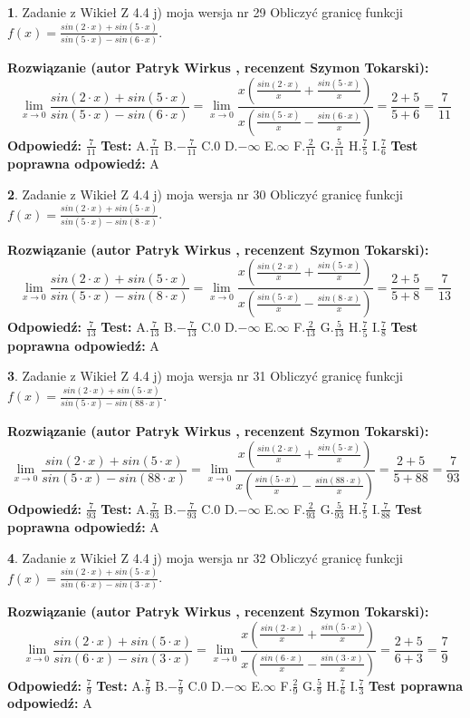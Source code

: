 \documentclass[12pt, a4paper]{article}
\theoremstyle{definition} %
\newtheorem{zad}{}
\newcommand{\zadStart}[1]{\begin{zad}#1\newline}
\newcommand{\zadStop}{\end{zad}}
\newcommand{\rozwStart}[2]{\noindent \textbf{Rozwiązanie (autor #1 , recenzent #2): }\newline}
\newcommand{\rozwStop}{\newline}
\newcommand{\odpStart}{\noindent \textbf{Odpowiedź:}\newline}
\newcommand{\odpStop}{\newline}
\newcommand{\testStart}{\noindent \textbf{Test:}\newline}
\newcommand{\testStop}{\newline}
\newcommand{\kluczStart}{\noindent \textbf{Test poprawna odpowiedź:}\newline}
\newcommand{\kluczStop}{\newline}
\begin{document}
\zadStart{Zadanie z Wikieł Z 4.4 j) moja wersja nr 29}
Obliczyć granicę funkcji $f(x)=\frac{sin(2\cdot x) +sin(5\cdot x)}{sin(5\cdot x) -sin(6\cdot x)}$.
\zadStop
\rozwStart{Patryk Wirkus}{Szymon Tokarski}
$$\lim\limits_{x\to 0}\frac{sin(2\cdot x) +sin(5\cdot x)}{sin(5\cdot x) -sin(6\cdot x)}=\lim\limits_{x\to 0}\frac{x(\frac{sin(2\cdot x)}{x}+\frac{sin(5\cdot x)}{x})}{x(\frac{sin(5\cdot x)}{x}-\frac{sin(6\cdot x)}{x})}=\frac{2+5}{5+6} = \frac{7}{11}$$
\rozwStop
\odpStart
$\frac{7}{11}$
\odpStop
\testStart
A.$\frac{7}{11}$
B.$-\frac{7}{11}$
C.$0$
D.$-\infty$
E.$\infty$
F.$\frac{2}{11}$
G.$\frac{5}{11}$
H.$\frac{7}{5}$
I.$\frac{7}{6}$
\testStop
\kluczStart
A
\kluczStop



\zadStart{Zadanie z Wikieł Z 4.4 j) moja wersja nr 30}
Obliczyć granicę funkcji $f(x)=\frac{sin(2\cdot x) +sin(5\cdot x)}{sin(5\cdot x) -sin(8\cdot x)}$.
\zadStop
\rozwStart{Patryk Wirkus}{Szymon Tokarski}
$$\lim\limits_{x\to 0}\frac{sin(2\cdot x) +sin(5\cdot x)}{sin(5\cdot x) -sin(8\cdot x)}=\lim\limits_{x\to 0}\frac{x(\frac{sin(2\cdot x)}{x}+\frac{sin(5\cdot x)}{x})}{x(\frac{sin(5\cdot x)}{x}-\frac{sin(8\cdot x)}{x})}=\frac{2+5}{5+8} = \frac{7}{13}$$
\rozwStop
\odpStart
$\frac{7}{13}$
\odpStop
\testStart
A.$\frac{7}{13}$
B.$-\frac{7}{13}$
C.$0$
D.$-\infty$
E.$\infty$
F.$\frac{2}{13}$
G.$\frac{5}{13}$
H.$\frac{7}{5}$
I.$\frac{7}{8}$
\testStop
\kluczStart
A
\kluczStop



\zadStart{Zadanie z Wikieł Z 4.4 j) moja wersja nr 31}
Obliczyć granicę funkcji $f(x)=\frac{sin(2\cdot x) +sin(5\cdot x)}{sin(5\cdot x) -sin(88\cdot x)}$.
\zadStop
\rozwStart{Patryk Wirkus}{Szymon Tokarski}
$$\lim\limits_{x\to 0}\frac{sin(2\cdot x) +sin(5\cdot x)}{sin(5\cdot x) -sin(88\cdot x)}=\lim\limits_{x\to 0}\frac{x(\frac{sin(2\cdot x)}{x}+\frac{sin(5\cdot x)}{x})}{x(\frac{sin(5\cdot x)}{x}-\frac{sin(88\cdot x)}{x})}=\frac{2+5}{5+88} = \frac{7}{93}$$
\rozwStop
\odpStart
$\frac{7}{93}$
\odpStop
\testStart
A.$\frac{7}{93}$
B.$-\frac{7}{93}$
C.$0$
D.$-\infty$
E.$\infty$
F.$\frac{2}{93}$
G.$\frac{5}{93}$
H.$\frac{7}{5}$
I.$\frac{7}{88}$
\testStop
\kluczStart
A
\kluczStop



\zadStart{Zadanie z Wikieł Z 4.4 j) moja wersja nr 32}
Obliczyć granicę funkcji $f(x)=\frac{sin(2\cdot x) +sin(5\cdot x)}{sin(6\cdot x) -sin(3\cdot x)}$.
\zadStop
\rozwStart{Patryk Wirkus}{Szymon Tokarski}
$$\lim\limits_{x\to 0}\frac{sin(2\cdot x) +sin(5\cdot x)}{sin(6\cdot x) -sin(3\cdot x)}=\lim\limits_{x\to 0}\frac{x(\frac{sin(2\cdot x)}{x}+\frac{sin(5\cdot x)}{x})}{x(\frac{sin(6\cdot x)}{x}-\frac{sin(3\cdot x)}{x})}=\frac{2+5}{6+3} = \frac{7}{9}$$
\rozwStop
\odpStart
$\frac{7}{9}$
\odpStop
\testStart
A.$\frac{7}{9}$
B.$-\frac{7}{9}$
C.$0$
D.$-\infty$
E.$\infty$
F.$\frac{2}{9}$
G.$\frac{5}{9}$
H.$\frac{7}{6}$
I.$\frac{7}{3}$
\testStop
\kluczStart
A
\kluczStop
\end{document}
